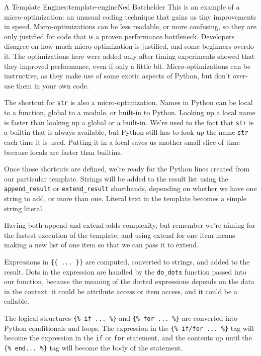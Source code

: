 \begin{aosachapter}{A Template Engine}{s:template-engine}{Ned Batchelder}
This is an example of a micro-optimization: an unusual coding technique
that gains us tiny improvements in speed. Micro-optimizations can be
less readable, or more confusing, so they are only justified for code
that is a proven performance bottleneck. Developers disagree on how much
micro-optimization is justified, and some beginners overdo it. The
optimizations here were added only after timing experiments showed that
they improved performance, even if only a little bit.
Micro-optimizations can be instructive, as they make use of some exotic
aspects of Python, but don't over-use them in your own code.

The shortcut for \texttt{str} is also a micro-optimization. Names in
Python can be local to a function, global to a module, or built-in to
Python. Looking up a local name is faster than looking up a global or a
built-in. We're used to the fact that \texttt{str} is a builtin that is
always available, but Python still has to look up the name \texttt{str}
each time it is used. Putting it in a local saves us another small slice
of time because locals are faster than builtins.

Once those shortcuts are defined, we're ready for the Python lines
created from our particular template. Strings will be added to the
result list using the \texttt{append\_result} or \texttt{extend\_result}
shorthands, depending on whether we have one string to add, or more than
one. Literal text in the template becomes a simple string literal.

Having both append and extend adds complexity, but remember we're aiming
for the fastest execution of the template, and using extend for one item
means making a new list of one item so that we can pass it to extend.

Expressions in \texttt{\{\{ ... \}\}} are computed, converted to
strings, and added to the result. Dots in the expression are handled by
the \texttt{do\_dots} function passed into our function, because the
meaning of the dotted expressions depends on the data in the context: it
could be attribute access or item access, and it could be a callable.

The logical structures \texttt{\{\% if ... \%\}} and
\texttt{\{\% for ... \%\}} are converted into Python conditionals and
loops. The expression in the \texttt{\{\% if/for ... \%\}} tag will
become the expression in the \texttt{if} or \texttt{for} statement, and
the contents up until the \texttt{\{\% end... \%\}} tag will become the
body of the statement.


\end{aosachapter}
